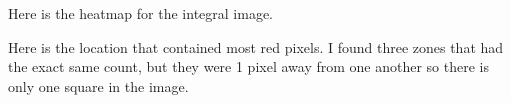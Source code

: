\documentclass{article}
\begin{document}
Here is the heatmap for the integral image.

Here is the location that contained most red pixels. I found three zones that had the exact same count, but they were 1 pixel away from one another so there is only one square in the image.
\newpage
\end{document}
